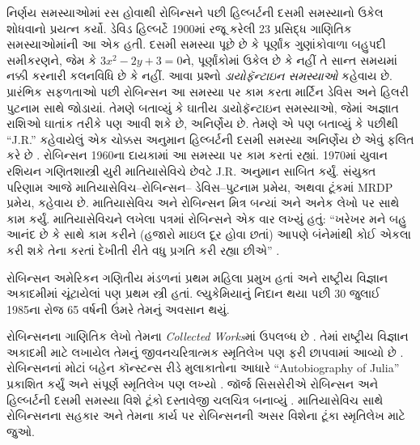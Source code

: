 નિર્ણય સમસ્યાઓમાં રસ હોવાથી
રોબિન્સને પછી હિલ્બર્ટની
દસમી સમસ્યાનો ઉકેલ શોધવાનો
પ્રયત્ન કર્યો. ડેવિડ હિલ્બર્ટે
1900માં રજૂ કરેલી 23 પ્રસિદ્ધ
ગાણિતિક સમસ્યાઓમાંની આ
એક હતી. દસમી સમસ્યા પૂછે
છે કે પૂર્ણાંક ગુણાંકોવાળા
બહુપદી સમીકરણને, જેમ કે
$3x^2 - 2y +3 = 0$ને,
પૂર્ણાંકોમાં ઉકેલ છે કે
નહીં તે સાન્ત સમયમાં
નક્કી કરનારી કલનવિધિ
છે કે નહીં. આવા પ્રશ્નો
\emph{ડાયોફૅન્ટાઇન સમસ્યાઓ}
કહેવાય છે. પ્રારંભિક
સફળતાઓ પછી રોબિન્સન
આ સમસ્યા પર કામ કરતા
માર્ટિન ડેવિસ અને
હિલરી પુટનામ સાથે
જોડાયાં. તેમણે બતાવ્યું
કે ઘાતીય ડાયોફૅન્ટાઇન
સમસ્યાઓ, જેમાં અજ્ઞાત
રાશિઓ ઘાતાંક તરીકે પણ
આવી શકે છે, અનિર્ણેય
છે. તેમણે એ પણ
બતાવ્યું કે પછીથી
“J.R.” કહેવાયેલું
એક ચોક્કસ અનુમાન
હિલ્બર્ટની દસમી
સમસ્યા અનિર્ણેય
છે એવું ફલિત કરે
છે \citep{DavisPutnamRobinson1961}.
રોબિન્સન 1960ના
દાયકામાં આ સમસ્યા
પર કામ કરતાં રહ્યાં.
1970માં યુવાન રશિયન
ગણિતશાસ્ત્રી યુરી
માતિયાસેવિચે છેવટે
J.R. અનુમાન સાબિત
કર્યું. સંયુક્ત પરિણામ
આજે માતિયાસેવિચ--રોબિન્સન--
ડેવિસ--પુટનામ પ્રમેય,
અથવા ટૂંકમાં MRDP પ્રમેય,
કહેવાય છે. માતિયાસેવિચ
અને રોબિન્સન મિત્ર
બન્યાં અને અનેક લેખો
પર સાથે કામ કર્યું.
માતિયાસેવિચને લખેલા
પત્રમાં રોબિન્સને
એક વાર લખ્યું હતું:
“ખરેખર મને બહુ આનંદ
છે કે સાથે કામ કરીને
(હજારો માઇલ દૂર
હોવા છતાં) આપણે
બંનેમાંથી કોઈ એકલા
કરી શકે તેના કરતાં
દેખીતી રીતે વધુ
પ્રગતિ કરી રહ્યા છીએ”
\citep[45]{Matijasevich1992}.

રોબિન્સન અમેરિકન
ગણિતીય મંડળનાં
પ્રથમ મહિલા પ્રમુખ
હતાં અને રાષ્ટ્રીય
વિજ્ઞાન અકાદમીમાં
ચૂંટાયેલાં પણ પ્રથમ
સ્ત્રી હતાં.
લ્યુકેમિયાનું નિદાન
થયા પછી 30 જુલાઈ
1985ના રોજ 65
વર્ષની ઉંમરે
તેમનું અવસાન થયું.

\begin{reading}
રોબિન્સનના ગાણિતિક
લેખો તેમના
\textit{Collected
  Works}માં ઉપલબ્ધ છે
\citep{Robinson1996}.
તેમાં રાષ્ટ્રીય વિજ્ઞાન
અકાદમી માટે લખાયેલ
તેમનું જીવનચરિત્રાત્મક
સ્મૃતિલેખ પણ ફરી
છાપવામાં આવ્યો છે
\citep{Feferman1994}.
રોબિન્સનનાં મોટાં
બહેન કૉન્સ્ટન્સ રીડે
મુલાકાતોના આધારે
“Autobiography of Julia”
પ્રકાશિત કર્યું
\citep{Reid1986}
અને સંપૂર્ણ
સ્મૃતિલેખ પણ લખ્યો
\citep{Reid1996}.
જૉર્જ સિસસેરીએ
રોબિન્સન અને
હિલ્બર્ટની દસમી
સમસ્યા વિશે ટૂંકો
દસ્તાવેજી ચલચિત્ર
બનાવ્યું
\citep{Csicsery2016}.
માતિયાસેવિચ સાથે
રોબિન્સનના સહકાર
અને તેમના કાર્ય પર
રોબિન્સનની અસર
વિશેના ટૂંકા
સ્મૃતિલેખ માટે
\citep{Matijasevich1992}
જુઓ.
\end{reading}
\endgroup


\begingroup
\makeatletter{}\makeatother


\label{guunit:OLP-0629}


